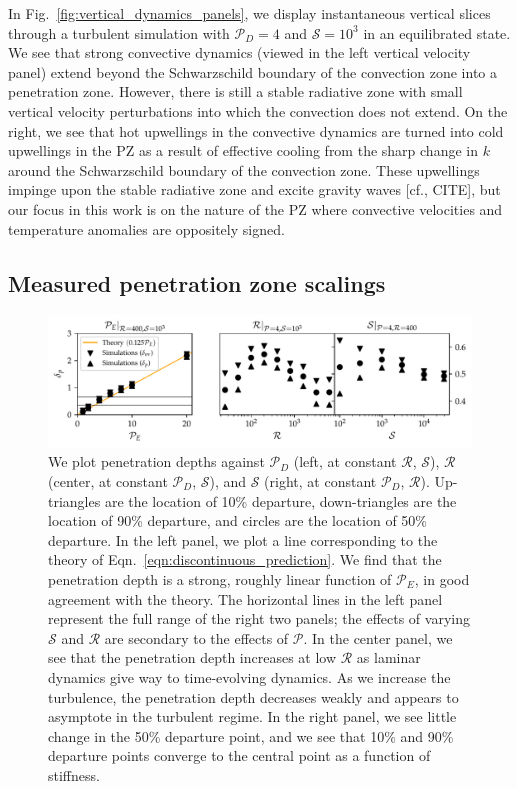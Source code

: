 \documentclass{aastex631}
\newcommand{\mP}{\ensuremath{\mathcal{P}}}
\newcommand{\mR}{\ensuremath{\mathcal{R}}}
\newcommand{\mS}{\ensuremath{\mathcal{S}}}
\begin{document}
In Fig.~\ref{fig:vertical_dynamics_panels}, we display instantaneous vertical slices through a turbulent simulation with $\mP_D = 4$ and $\mS = 10^3$ in an equilibrated state.
We see that strong convective dynamics (viewed in the left vertical velocity panel) extend beyond the Schwarzschild boundary of the convection zone into a penetration zone.
However, there is still a stable radiative zone with small vertical velocity perturbations into which the convection does not extend.
On the right, we see that hot upwellings in the convective dynamics are turned into cold upwellings in the PZ as a result of effective cooling from the sharp change in $k$ around the Schwarzschild boundary of the convection zone.
These upwellings impinge upon the stable radiative zone and excite gravity waves [cf., CITE], but our focus in this work is on the nature of the PZ where convective velocities and temperature anomalies are oppositely signed.

\subsection{Measured penetration zone scalings}

\begin{figure}[t!]
\centering
\includegraphics[width=\textwidth]{erf_3D_penetration_depths.pdf}
\caption{
We plot penetration depths against $\mP_D$ (left, at constant $\mR$, $\mS$), $\mR$ (center, at constant $\mP_D$, $\mS$), and $\mS$ (right, at constant $\mP_D$, $\mR$).
Up-triangles are the location of 10\% departure, down-triangles are the location of 90\% departure, and circles are the location of 50\% departure.
In the left panel, we plot a line corresponding to the theory of Eqn.~\ref{eqn:discontinuous_prediction}.
We find that the penetration depth is a strong, roughly linear function of $\mP_E$, in good agreement with the theory.
The horizontal lines in the left panel represent the full range of the right two panels; the effects of varying $\mS$ and $\mR$ are secondary to the effects of $\mP$.
In the center panel, we see that the penetration depth increases at low $\mR$ as laminar dynamics give way to time-evolving dynamics.
As we increase the turbulence, the penetration depth decreases weakly and appears to asymptote in the turbulent regime.
In the right panel, we see little change in the 50\% departure point, and we see that 10\% and 90\% departure points converge to the central point as a function of stiffness.
\label{fig:erf_3D_penetration_depths}
}
\end{figure}
\end{document}
